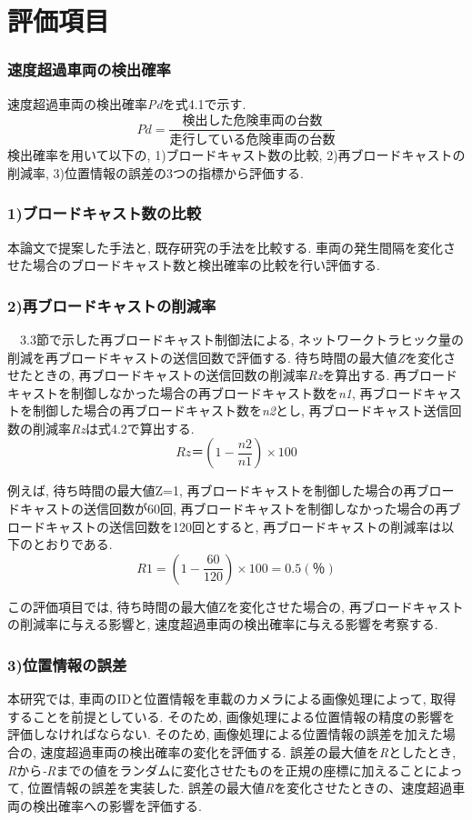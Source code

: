 \documentclass[10pt]{jreport}
\begin{document}
\section{評価項目}
\subsubsection{速度超過車両の検出確率}
速度超過車両の検出確率{\it Pd}を式4.1で示す. 
\begin{equation}
Pd = \dfrac{検出した危険車両の台数}{走行している危険車両の台数}
\end{equation}
検出確率を用いて以下の, 1)ブロードキャスト数の比較, 2)再ブロードキャストの削減率, 3)位置情報の誤差の3つの指標から評価する. 

\subsubsection{1)ブロードキャスト数の比較}
本論文で提案した手法と, 既存研究の手法を比較する. 車両の発生間隔を変化させた場合のブロードキャスト数と検出確率の比較を行い評価する. 

\subsubsection{2)再ブロードキャストの削減率}
 　3.3節で示した再ブロードキャスト制御法による, ネットワークトラヒック量の削減を再ブロードキャストの送信回数で評価する. 待ち時間の最大値{\it Z}を変化させたときの, 再ブロードキャストの送信回数の削減率{\it Rz}を算出する.  再ブロードキャストを制御しなかった場合の再ブロードキャスト数を{\it n1}, 再ブロードキャストを制御した場合の再ブロードキャスト数を{\it n2}とし, 再ブロードキャスト送信回数の削減率{\it Rz}は式4.2で算出する. 
\begin{equation}
Rz＝(1-\dfrac{n2}{n1}) × 100
\end{equation}

例えば, 待ち時間の最大値Z=1, 再ブロードキャストを制御した場合の再ブロードキャストの送信回数が60回, 再ブロードキャストを制御しなかった場合の再ブロードキャストの送信回数を120回とすると, 再ブロードキャストの削減率は以下のとおりである. 
\begin{equation*}
R1=(1 - \dfrac{60}{120}) × 100 = 0.5(％)
\end{equation*}

この評価項目では, 待ち時間の最大値Zを変化させた場合の, 再ブロードキャストの削減率に与える影響と, 速度超過車両の検出確率に与える影響を考察する. 

\subsubsection{3)位置情報の誤差}
本研究では, 車両のIDと位置情報を車載のカメラによる画像処理によって, 取得することを前提としている. そのため, 画像処理による位置情報の精度の影響を評価しなければならない. そのため, 画像処理による位置情報の誤差を加えた場合の, 速度超過車両の検出確率の変化を評価する. 誤差の最大値を{\it R}としたとき, {\it R}から{\it -R}までの値をランダムに変化させたものを正規の座標に加えることによって, 位置情報の誤差を実装した. 誤差の最大値{\it R}を変化させたときの、速度超過車両の検出確率への影響を評価する.
\end{document}
